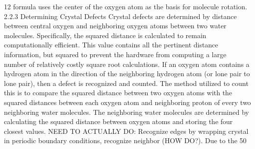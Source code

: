  1 2 
 
 f o r m u l a   u s e s   t h e   c e n t e r   o f   t h e   o x y g e n   a t o m   a s   t h e   b a s i s   f o r   m o l e c u l e   r o t a t i o n . 
 2 . 2 . 3   D e t e r m i n i n g   C r y s t a l   D e f e c t s 
 C r y s t a l   d e f e c t s   a r e   d e t e r m i n e d   b y   d i s t a n c e   b e t w e e n   c e n t r a l   o x y g e n   a n d   n e i g h b o r i n g   o x y g e n   a t o m s   b e t w e e n   t w o   w a t e r   m o l e c u l e s .   S p e c i f i c a l l y ,   t h e   s q u a r e d   d i s t a n c e   i s   c a l c u l a t e d   t o   r e m a i n   c o m p u t a t i o n a l l y   e f f i c i e n t .   T h i s   v a l u e   c o n t a i n s   a l l   t h e   p e r t i n e n t   d i s t a n c e   i n f o r m a t i o n ,   b u t   s q u a r e d   t o   p r e v e n t   t h e   h a r d w a r e   f r o m   c o m p u t i n g   a   l a r g e   n u m b e r   o f   r e l a t i v e l y   c o s t l y   s q u a r e   r o o t   c a l c u l a t i o n s .   I f   a n   o x y g e n   a t o m   c o n t a i n s   a   h y d r o g e n   a t o m   i n   t h e   d i r e c t i o n   o f   t h e   n e i g h b o r i n g   h y d r o g e n   a t o m   ( o r   l o n e   p a i r   t o   l o n e   p a i r ) ,   t h e n   a   d e f e c t   i s   r e c o g n i z e d   a n d   c o u n t e d .   T h e   m e t h o d   u t i l i z e d   t o   c o u n t   t h i s   i s   t o   c o m p a r e   t h e   s q u a r e d   d i s t a n c e   b e t w e e n   t w o   o x y g e n   a t o m s   w i t h   t h e   s q u a r e d   d i s t a n c e s   b e t w e e n   e a c h   o x y g e n   a t o m   a n d   n e i g h b o r i n g   p r o t o n   o f   e v e r y   t w o   n e i g h b o r i n g   w a t e r   m o l e c u l e s .   T h e   n e i g h b o r i n g   w a t e r   m o l e c u l e s   a r e   d e t e r m i n e d   b y   c a l c u l a t i n g   t h e   s q u a r e d   d i s t a n c e   b e t w e e n   o x y g e n   a t o m s   a n d   s t o r i n g   t h e   f o u r   c l o s e s t   v a l u e s . 
 N E E D   T O   A C T U A L L Y   D O :   R e c o g n i z e   e d g e s   b y   w r a p p i n g   c r y s t a l   i n   p e r i o d i c   b o u n d a r y   c o n d i t i o n s ,   r e c o g n i z e   n e i g h b o r   ( H O W   D O ? ) . 
 D u e   t o   t h e   5 0 %
